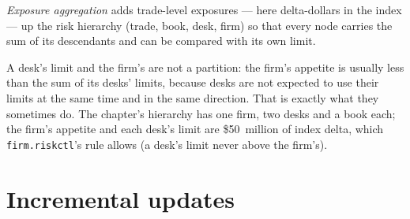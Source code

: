\begin{definition}\label{def:pl:real-time-risk:aggregation}
\emph{Exposure aggregation} adds trade-level exposures --- here delta-dollars in the index --- up the risk
hierarchy (trade, book, desk, firm) so that every node carries the sum of its descendants and can be compared with its own limit.
\end{definition}

A desk's limit and the firm's are not a partition: the firm's appetite is usually less than the sum of its desks' limits, because desks are
not expected to use their limits at the same time and in the same direction. That is exactly what they sometimes do. The chapter's
hierarchy has one firm, two desks and a book each; the firm's appetite and each desk's limit are \$50~million of index delta, which
\texttt{firm.riskctl}'s rule allows (a desk's limit never above the firm's).

\begin{omfigure}

\label{fig:pl:real-time-risk:hierarchy}
\end{omfigure}

\section{Incremental updates}

